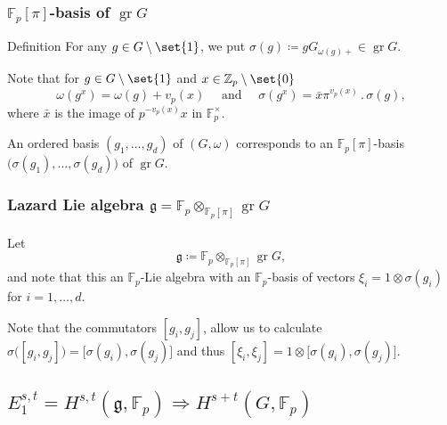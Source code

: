 \documentclass{beamer}
\newcommand*\Z{\mathbb{Z}}
\newcommand*\F{\mathbb{F}}
\newcommand*\G{\mathbb{G}}
\DeclareMathOperator{\GL}{GL} %
\DeclareMathOperator{\gr}{gr} %
\newcommand*{\lie}[1]{\mathfrak{#1}} %
\newcommand*\act{\,.\,} %
\newcommand*\defeq{\coloneqq}
\begin{document}
\begin{frame}
  \frametitle{$\F_{p}[\pi]$-basis of $\gr G$}

 \begin{block}{Definition}
    For any $g \in G \setminus \set{1}$, we put $\sigma(g) \defeq gG_{\omega(g)+} \in \gr G$.
  \end{block}

  Note that for $g \in G \setminus \set{1}$ and $x \in \Z_{p} \setminus \set{0}$
  \[
    \omega(g^{x}) = \omega(g) + v_{p}(x) \quad \text{ and } \quad \sigma(g^{x}) = \bar{x}\pi^{v_{p}(x)} \act \sigma(g),
  \]
  where $\bar{x}$ is the image of $p^{-v_{p}(x)}x$ in $\F_{p}^{\times}$.

  An ordered basis $(g_{1},\dotsc,g_{d})$ of $(G,\omega)$ corresponds to an $\F_{p}[\pi]$-basis $\bigl( \sigma(g_{1}),\dotsc,\sigma(g_{d}) \bigr)$ of $\gr G$.
\end{frame}

\begin{frame}
  \frametitle{Lazard Lie algebra $\lie{g} = \F_{p} \otimes_{\F_{p}[\pi]} \gr G$}

  Let \[ \lie{g} \defeq \F_{p} \otimes_{\F_{p}[\pi]} \gr G, \] and note that this an $\F_{p}$-Lie algebra with an $\F_{p}$-basis of vectors $\xi_{i} = 1 \otimes \sigma(g_{i})$ for $i=1,\dotsc,d$.

  \pause

  Note that the commutators $[g_{i},g_{j}]$, allow us to calculate $\sigma\bigl( [g_{i},g_{j}] \bigr) = \bigl[ \sigma(g_{i}), \sigma(g_{j}) \bigr]$ and thus $[\xi_{i},\xi_{j}] = 1 \otimes \bigl[ \sigma(g_{i}),\sigma(g_{j}) \bigr]$.
\end{frame}






\subsection{\texorpdfstring{$E_1^{s,t} = H^{s,t}(\lie{g},\F_p) \Longrightarrow H^{s+t}(G,\F_p)$}{Multiplicative spectral sequence}}
\end{document}
